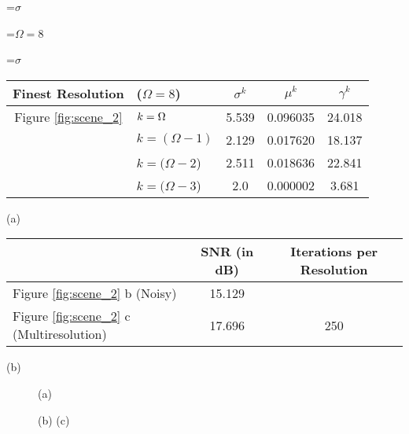 {\newpage
\clearpage
\samepage \setbox\sizebox=\hbox{$\sigma$}\box\sizebox
}

{\newpage
\clearpage
\samepage \setbox\sizebox=\hbox{$\Omega
 =8$}\box\sizebox
}

{\newpage
\clearpage
\samepage \setbox\sizebox=\hbox{$\sigma$}\box\sizebox
}

{\newpage
\clearpage
\samepage \begin{table}%
\begin{center}
 
\begin{tabular}{||cl||c|c|c||} \hline \hline
Finest Resolution &($\Omega=8$)& $\sigma^k$ & $\mu^k$  & $\gamma^k$ \\  
\hline \hline 
 Figure \ref{fig:scene_2}         &$k=\Omega$ &5.539 &0.096035& 24.018\\ 
             & $k=(\Omega
 -1)$  &2.129 &0.017620&18.137 \\ 
             &$k=(\Omega
 -2$) &2.511  &0.018636& 22.841\\ 
             &$k=(\Omega
 -3$) &2.0  &0.000002& 3.681 \\  \hline \hline
\end{tabular}
\centerline{(a)} 

\vspace{1ex}

 \begin{tabular}{||l||c|c||}\hline \hline   
& SNR (in dB)& Iterations per Resolution \\  \hline \hline
 Figure \ref{fig:scene_2}  b (Noisy) &  15.129 &      \\  \hline
 Figure \ref{fig:scene_2}  c (Multiresolution)& 17.696   & 250  \\  \hline \hline
 \end{tabular}
 \centerline{(b)}
 
 \label{tab:scene_2}
 \end{center}
 
 \end{table}
}

{\newpage
\clearpage
\samepage \begin{figure}\centerline{ \hfill
{} \hfill} 
\centerline{ \hfill (a) \hfill} \vspace{2ex}
\centerline{ \hfill
{} \hfill
{} \hfill
}
 \centerline{\hfill (b) \hfill (c) \hfill}
 
 \label{fig:scene_3}
 \end{figure}
}

